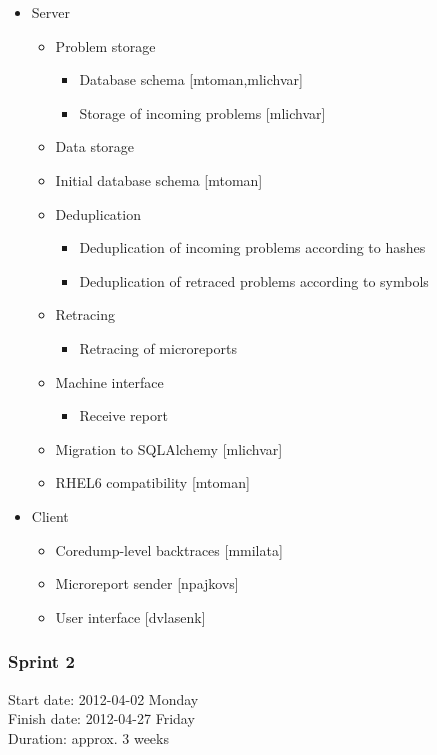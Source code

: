 \documentclass{article}
\begin{document}
\begin{itemize}
\item Server
  \begin{itemize}
  \item Problem storage
    \begin{itemize}
    \item Database schema [mtoman,mlichvar]
    \item Storage of incoming problems [mlichvar]
    \end{itemize}
  \item Data storage
    \item Initial database schema [mtoman]
  \item Deduplication
    \begin{itemize}
    \item Deduplication of incoming problems according to hashes
    \item Deduplication of retraced problems according to symbols
    \end{itemize}
  \item Retracing
    \begin{itemize}
    \item Retracing of microreports
    \end{itemize}
  \item Machine interface
    \begin{itemize}
    \item Receive report
    \end{itemize}
  \item Migration to SQLAlchemy [mlichvar]
  \item RHEL6 compatibility [mtoman]
  \end{itemize}
\item Client
  \begin{itemize}
  \item Coredump-level backtraces [mmilata]
  \item Microreport sender [npajkovs]
  \item User interface [dvlasenk]
  \end{itemize}
\end{itemize}

\cleardoublepage
\subsubsection{Sprint 2}
Start date: 2012-04-02 Monday \\
Finish date: 2012-04-27 Friday \\
Duration: approx. 3 weeks
\end{document}
